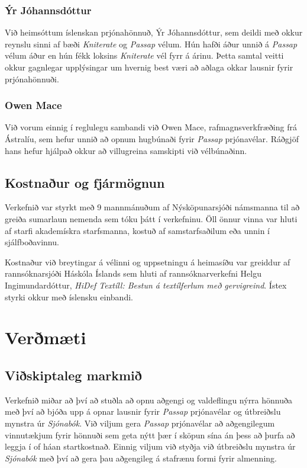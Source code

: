 \documentclass[a4paper,12pt,twoside]{article}
\begin{document}
\subsubsection{Ýr Jóhannsdóttur}
Við heimsóttum íslenskan prjónahönnuð, Ýr Jóhannsdóttur, sem deildi með okkur reynslu sinni af bæði \textit{Kniterate} og \textit{Passap} vélum. Hún hafði áður unnið á \textit{Passap} vélum áður en hún fékk loksins \textit{Kniterate} vél fyrr á árinu. Þetta samtal veitti okkur gagnlegar upplýsingar um hvernig best væri að aðlaga okkar lausnir fyrir prjónahönnuði.

\subsubsection{Owen Mace}
Við vorum einnig í reglulegu sambandi við Owen Mace, rafmagnsverkfræðing frá Ástralíu, sem hefur unnið að opnum hugbúnaði fyrir \textit{Passap} prjónavélar. Ráðgjöf hans hefur hjálpað okkur að villugreina samskipti við vélbúnaðinn. 

\subsection{Kostnaður og fjármögnun}
Verkefnið var styrkt með 9 mannmánuðum af Nýsköpunarsjóði námsmanna til að greiða sumarlaun nemenda sem tóku þátt í verkefninu. Öll önnur vinna var hluti af starfi akademískra starfsmanna, kostuð af samstarfsaðilum eða unnin í sjálfboðavinnu.

Kostnaður við breytingar á vélinni og uppsetningu á heimasíðu var greiddur af rannsóknarsjóði Háskóla Íslands sem hluti af rannsóknarverkefni Helgu Ingimundardóttur, \textit{HiDef Textíll: Bestun á textílferlum með gervigreind}. Ístex styrki okkur með íslensku einbandi.

\section{Verðmæti}
\subsection{Viðskiptaleg markmið}
Verkefnið miðar að því að stuðla að opnu aðgengi og valdeflingu nýrra hönnuða með því að bjóða upp á opnar lausnir fyrir \textit{Passap} prjónavélar og útbreiðslu mynstra úr \textit{Sjónabók}. Við viljum gera \textit{Passap} prjónavélar að aðgengilegum vinnutækjum fyrir hönnuði sem geta nýtt þær í sköpun sína án þess að þurfa að leggja í of háan startkostnað. Einnig viljum við styðja við útbreiðslu mynstra úr \textit{Sjónabók} með því að gera þau aðgengileg á stafrænu formi fyrir almenning.
\end{document}
